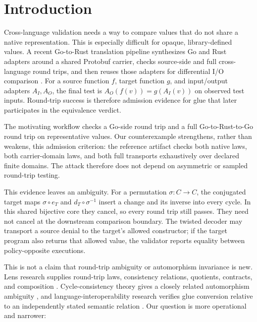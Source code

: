 \documentclass[sigconf,anonymous,review]{acmart}
\begin{document}
\maketitle

\section{Introduction}

Cross-language validation needs a way to compare values that do not
share a native representation.  This is especially difficult for
opaque, library-defined values.  A recent Go-to-Rust translation
pipeline synthesizes Go and Rust adapters around a shared Protobuf
carrier, checks source-side and full cross-language round trips, and
then reuses those adapters for differential I/O comparison
\cite{zhang2026validated}.  For a source function $f$, target function
$g$, and input/output adapters $A_I,A_O$, the final test is
$A_O(f(v))=g(A_I(v))$ on observed test inputs.  Round-trip success is
therefore admission evidence for glue that later participates in the
equivalence verdict.

The motivating workflow checks a Go-side round trip and a full
Go-to-Rust-to-Go round trip on representative values.  Our counterexample
strengthens, rather than weakens, this admission criterion: the reference
artifact checks both native laws, both carrier-domain laws, and both full
transports exhaustively over declared finite domains.  The attack therefore
does not depend on asymmetric or sampled round-trip testing.

This evidence leaves an ambiguity.  For a permutation $\sigma:C\to C$,
the conjugated target maps $\sigma\circ e_T$ and $d_T\circ\sigma^{-1}$
insert a change and its inverse into every cycle.  In this shared bijective
core they cancel, so every round trip still passes.
They need not cancel at the downstream comparison boundary.  The
twisted decoder may transport a source denial to the target's allowed
constructor; if the target program also returns that allowed value,
the validator reports equality between policy-opposite executions.

This is not a claim that round-trip ambiguity or automorphism
invariance is new.  Lens research supplies round-trip laws,
consistency relations, quotients, contracts, and composition
\cite{foster2007lenses,hofmann2011symmetric,foster2008quotient,zhang2023contract,xia2019monadic}.
Cycle-consistency theory gives a closely related automorphism
ambiguity \cite{moriakov2020cyclegan}, and language-interoperability
research verifies glue conversion relative to an independently stated
semantic relation \cite{patterson2022semantic}.  Our question is more
operational and narrower:
\end{document}
